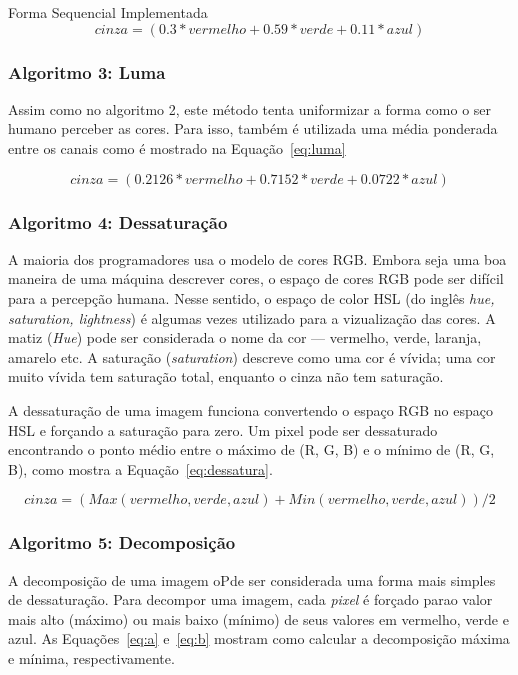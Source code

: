 \begin{subsection}{Forma Sequencial Implementada}
\begin{equation}
\label{eq:luminancia}
cinza = (0.3*vermelho + 0.59*verde + 0.11*azul)
\end{equation}

\subsubsection{Algoritmo 3: Luma}

Assim como no algoritmo 2, este método tenta uniformizar a forma como o ser
humano perceber as cores. Para isso, também é utilizada uma média ponderada
entre os canais como é mostrado na Equação~\ref{eq:luma}

\begin{equation}
\label{eq:luma}
cinza = (0.2126*vermelho + 0.7152*verde + 0.0722*azul)
\end{equation}


\subsubsection{Algoritmo 4: Dessaturação}

A maioria dos programadores usa o modelo de cores RGB. Embora seja uma boa
maneira de uma máquina descrever cores, o espaço de cores RGB pode ser difícil
para a percepção humana. Nesse sentido, o espaço de color HSL (do inglês
\textit{hue, saturation, lightness}) é algumas vezes utilizado para a
vizualização das cores. A matiz (\textit{Hue}) pode ser considerada o nome da
cor --- vermelho, verde, laranja, amarelo etc.  A saturação
(\textit{saturation}) descreve como uma cor é vívida; uma cor muito vívida tem
saturação total, enquanto o cinza não tem saturação. 

A dessaturação de uma imagem funciona convertendo o espaço RGB no espaço HSL e 
forçando a saturação para zero. Um pixel pode ser dessaturado encontrando o
ponto médio entre o máximo de (R, G, B) e o mínimo de (R, G, B), como mostra a
Equação~\ref{eq:dessatura}.

\begin{equation}
\label{eq:dessatura}
cinza = ( Max(vermelho, verde, azul) + Min(vermelho, verde, azul) ) / 2
\end{equation}



\subsubsection{Algoritmo 5: Decomposição}
A decomposição de uma imagem oPde ser considerada uma forma mais simples de
dessaturação. Para decompor uma imagem, cada \textit{pixel} é forçado parao
valor mais alto (máximo) ou mais baixo (mínimo) de seus valores em vermelho,
verde e azul. As Equações~\ref{eq:a} e~\ref{eq:b} mostram como calcular a
decomposição máxima e mínima, respectivamente.


\end{subsection}
